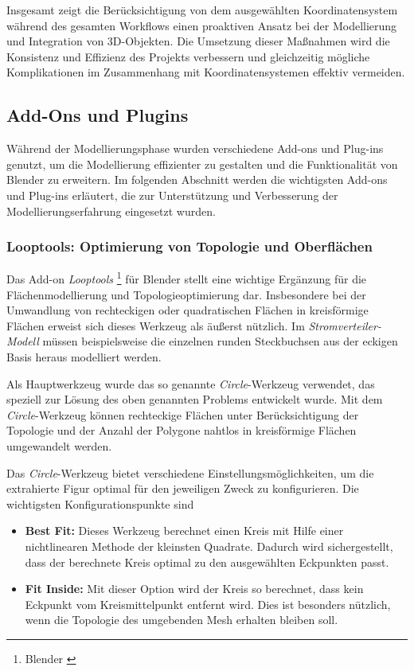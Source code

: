 Insgesamt zeigt die Berücksichtigung von dem ausgewählten Koordinatensystem während des gesamten Workflows einen proaktiven Ansatz bei der Modellierung und Integration von 3D-Objekten. Die Umsetzung dieser Maßnahmen wird die Konsistenz und Effizienz des Projekts verbessern und gleichzeitig mögliche Komplikationen im Zusammenhang mit Koordinatensystemen effektiv vermeiden.

\subsection{Add-Ons und Plugins}
Während der Modellierungsphase wurden verschiedene Add-ons und Plug-ins genutzt, um die Modellierung effizienter zu gestalten und die Funktionalität von Blender zu erweitern.   Im folgenden Abschnitt werden die wichtigsten Add-ons und Plug-ins erläutert, die zur Unterstützung und Verbesserung der Modellierungserfahrung eingesetzt wurden.

\subsubsection{Looptools: Optimierung von Topologie und Oberflächen}
Das Add-on \textit{Looptools} \footnote{Blender \cite{LoopTools}} für Blender stellt eine wichtige Ergänzung für die Flächenmodellierung und Topologieoptimierung dar.  Insbesondere bei der Umwandlung von rechteckigen oder quadratischen Flächen in kreisförmige Flächen erweist sich dieses Werkzeug als äußerst nützlich. Im \textit{Stromverteiler-Modell} müssen beispielsweise die einzelnen runden Steckbuchsen aus der eckigen Basis heraus modelliert werden.

Als Hauptwerkzeug wurde das so genannte \textit{Circle}-Werkzeug verwendet, das speziell zur Lösung des oben genannten Problems entwickelt wurde. Mit dem \textit{Circle}-Werkzeug können rechteckige Flächen unter Berücksichtigung der Topologie und der Anzahl der Polygone nahtlos in kreisförmige Flächen umgewandelt werden.

Das \textit{Circle}-Werkzeug bietet verschiedene Einstellungsmöglichkeiten, um die extrahierte Figur optimal für den jeweiligen Zweck zu konfigurieren. Die wichtigsten Konfigurationspunkte sind

\begin{itemize}
    \item \textbf{Best Fit:} Dieses Werkzeug berechnet einen Kreis mit Hilfe einer nichtlinearen Methode der kleinsten Quadrate. Dadurch wird sichergestellt, dass der berechnete Kreis optimal zu den ausgewählten Eckpunkten passt.
    \item \textbf{Fit Inside:} Mit dieser Option wird der Kreis so berechnet, dass kein Eckpunkt vom Kreismittelpunkt entfernt wird. Dies ist besonders nützlich, wenn die Topologie des umgebenden Mesh erhalten bleiben soll.
\end{itemize}

